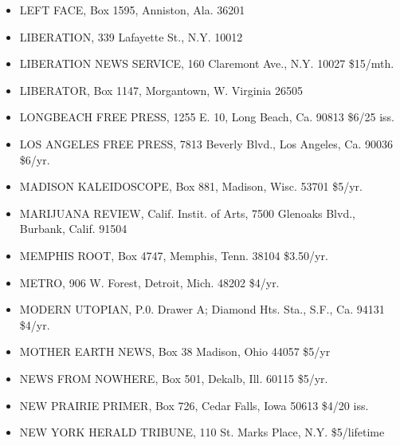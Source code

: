 \documentclass[11pt,twoside,a4paper]{book}
\begin{document}
\begin{minipage}[t]{0.20\textwidth}
\begin{scriptsize}
\begin{itemize}
	\item[] LEFT FACE, Box 1595, Anniston, Ala. 36201 
	\item[] LIBERATION, 339 Lafayette St., N.Y. 10012 
	\item[] LIBERATION NEWS SERVICE, 160 Claremont Ave., N.Y. 10027 \$15/mth. 
	\item[] LIBERATOR, Box 1147, Morgantown, W. Virginia 26505 
	\item[] LONGBEACH FREE PRESS, 1255 E. 10, Long Beach, Ca. 90813 \$6/25 iss. 
	\item[] LOS ANGELES FREE PRESS, 7813 Beverly Blvd., Los Angeles, Ca. 90036	\$6/yr. 
	\item[] MADISON KALEIDOSCOPE, Box 881, Madison, Wisc. 53701 \$5/yr. 
	\item[] MARIJUANA REVIEW, Calif. Instit. of Arts, 7500 Glenoaks Blvd.,	Burbank, Calif. 91504 	
	\item[] MEMPHIS ROOT, Box 4747, Memphis, Tenn. 38104 \$3.50/yr. 
	\item[] METRO, 906 W. Forest, Detroit, Mich. 48202 \$4/yr. 
	\item[] MODERN UTOPIAN, P.0. Drawer A; Diamond Hts. Sta., S.F., Ca.	94131 \$4/yr. 
	\item[] MOTHER EARTH NEWS, Box 38 Madison, Ohio 44057 \$5/yr 
	\item[] NEWS FROM NOWHERE, Box 501, Dekalb, Ill. 60115 \$5/yr. 
	\item[] NEW PRAIRIE PRIMER, Box 726, Cedar Falls, Iowa 50613 \$4/20 iss. 
	\item[] NEW YORK HERALD TRIBUNE, 110 St. Marks Place, N.Y. \$5/lifetime 
\end{itemize}
\end{scriptsize}
\end{minipage}\hfill
\end{document}
